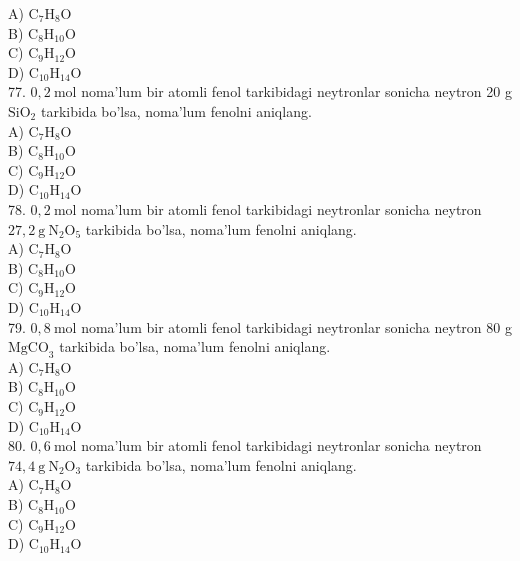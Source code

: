A) $\mathrm{C}_{7} \mathrm{H}_{8} \mathrm{O}$\\
B) $\mathrm{C}_{8} \mathrm{H}_{10} \mathrm{O}$\\
C) $\mathrm{C}_{9} \mathrm{H}_{12} \mathrm{O}$\\
D) $\mathrm{C}_{10} \mathrm{H}_{14} \mathrm{O}$\\
77. $0,2 \mathrm{~mol}$ noma'lum bir atomli fenol tarkibidagi neytronlar sonicha neytron 20 g $\mathrm{SiO}_{2}$ tarkibida bo'lsa, noma'lum fenolni aniqlang.\\
A) $\mathrm{C}_{7} \mathrm{H}_{8} \mathrm{O}$\\
B) $\mathrm{C}_{8} \mathrm{H}_{10} \mathrm{O}$\\
C) $\mathrm{C}_{9} \mathrm{H}_{12} \mathrm{O}$\\
D) $\mathrm{C}_{10} \mathrm{H}_{14} \mathrm{O}$\\
78. $0,2 \mathrm{~mol}$ noma'lum bir atomli fenol tarkibidagi neytronlar sonicha neytron $27,2 \mathrm{~g} \mathrm{~N}_{2} \mathrm{O}_{5}$ tarkibida bo'lsa, noma'lum fenolni aniqlang.\\
A) $\mathrm{C}_{7} \mathrm{H}_{8} \mathrm{O}$\\
B) $\mathrm{C}_{8} \mathrm{H}_{10} \mathrm{O}$\\
C) $\mathrm{C}_{9} \mathrm{H}_{12} \mathrm{O}$\\
D) $\mathrm{C}_{10} \mathrm{H}_{14} \mathrm{O}$\\
79. $0,8 \mathrm{~mol}$ noma'lum bir atomli fenol tarkibidagi neytronlar sonicha neytron 80 g $\mathrm{MgCO}_{3}$ tarkibida bo'lsa, noma'lum fenolni aniqlang.\\
A) $\mathrm{C}_{7} \mathrm{H}_{8} \mathrm{O}$\\
B) $\mathrm{C}_{8} \mathrm{H}_{10} \mathrm{O}$\\
C) $\mathrm{C}_{9} \mathrm{H}_{12} \mathrm{O}$\\
D) $\mathrm{C}_{10} \mathrm{H}_{14} \mathrm{O}$\\
80. $0,6 \mathrm{~mol}$ noma'lum bir atomli fenol tarkibidagi neytronlar sonicha neytron $74,4 \mathrm{~g} \mathrm{~N}_{2} \mathrm{O}_{3}$ tarkibida bo'lsa, noma'lum fenolni aniqlang.\\
A) $\mathrm{C}_{7} \mathrm{H}_{8} \mathrm{O}$\\
B) $\mathrm{C}_{8} \mathrm{H}_{10} \mathrm{O}$\\
C) $\mathrm{C}_{9} \mathrm{H}_{12} \mathrm{O}$\\
D) $\mathrm{C}_{10} \mathrm{H}_{14} \mathrm{O}$\\
